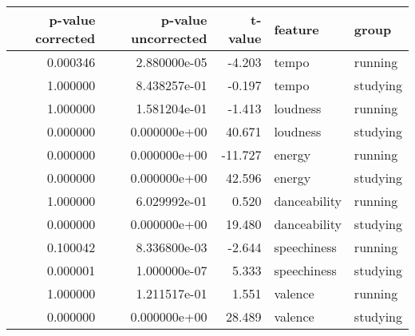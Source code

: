 \begin{tabular}{rrrll}
\toprule
 p-value corrected &  p-value uncorrected &  t-value &      feature &    group \\
\midrule
          0.000346 &         2.880000e-05 &   -4.203 &        tempo &  running \\
          1.000000 &         8.438257e-01 &   -0.197 &        tempo & studying \\
          1.000000 &         1.581204e-01 &   -1.413 &     loudness &  running \\
          0.000000 &         0.000000e+00 &   40.671 &     loudness & studying \\
          0.000000 &         0.000000e+00 &  -11.727 &       energy &  running \\
          0.000000 &         0.000000e+00 &   42.596 &       energy & studying \\
          1.000000 &         6.029992e-01 &    0.520 & danceability &  running \\
          0.000000 &         0.000000e+00 &   19.480 & danceability & studying \\
          0.100042 &         8.336800e-03 &   -2.644 &  speechiness &  running \\
          0.000001 &         1.000000e-07 &    5.333 &  speechiness & studying \\
          1.000000 &         1.211517e-01 &    1.551 &      valence &  running \\
          0.000000 &         0.000000e+00 &   28.489 &      valence & studying \\
\bottomrule
\end{tabular}
